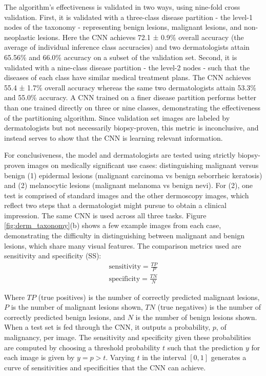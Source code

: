 The algorithm’s effectiveness is validated in two ways, using nine-fold cross validation. First, it is validated with a three-class disease partition - the level-1 nodes of the taxonomy - representing benign lesions, malignant lesions, and non-neoplastic lesions. Here the CNN achieves 72.1 ± 0.9\% overall accuracy (the average of individual inference class accuracies) and two dermatologists attain 65.56\% and 66.0\% accuracy on a subset of the validation set. Second, it is validated with a nine-class disease partition - the level-2 nodes - such that the diseases of each class have similar medical treatment plans. The CNN achieves 55.4 ± 1.7\% overall accuracy whereas the same two dermatologists attain 53.3\% and 55.0\% accuracy. A CNN trained on a finer disease partition performs better than one trained directly on three or nine classes, demonstrating the effectiveness of the partitioning algorithm. Since validation set images are labeled by dermatologists but not necessarily biopsy-proven, this metric is inconclusive, and instead serves to show that the CNN is learning relevant information.

For conclusiveness, the model and dermatologists are tested using strictly biopsy-proven images on medically significant use cases: distinguishing malignant versus benign (1) epidermal lesions (malignant carcinoma vs benign seborrheic keratosis) and (2) melanocytic lesions (malignant melanoma vs benign nevi). For (2), one test is comprised of standard images and the other dermoscopy images, which reflect two steps that a dermatologist might pursue to obtain a clinical impression. The same CNN is used across all three tasks. Figure \ref{fig:derm_taxonomy}(b) shows a few example images from each case, demonstrating the difficulty in distinguishing between malignant and benign lesions, which share many visual features. The comparison metrics used are sensitivity and specificity (SS):
\begin{gather}
    \text{sensitivity} = \frac{TP}{P} \\
    \text{specificity} = \frac{TN}{N}
\end{gather}

Where $TP$ (true positives) is the number of correctly predicted malignant lesions, $P$ is the number of malignant lesions shown, $TN$ (true negatives) is the number of correctly predicted benign lesions, and $N$ is the number of benign lesions shown. When a test set is fed through the CNN, it outputs a probability, $p$, of malignancy, per image. The sensitivity and specificity given these probabilities are computed by choosing a threshold probability $t$ such that the prediction $y$ for each image is given by $y = p > t$. Varying $t$ in the interval $[0,1]$ generates a curve of sensitivities and specificities that the CNN can achieve.

